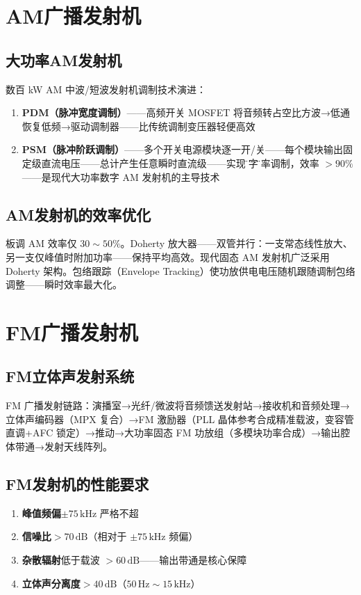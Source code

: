 \documentclass[12pt,UTF8]{ctexbook}
\begin{document}
\section{AM广播发射机}
\label{sec:am_broadcast_tx}

\subsection{大功率AM发射机}

数百 kW AM 中波/短波发射机调制技术演进：
\begin{enumerate}
\item \textbf{PDM（脉冲宽度调制）}——高频开关 MOSFET 将音频转占空比方波→低通恢复低频→驱动调制器——比传统调制变压器轻便高效
\item \textbf{PSM（脉冲阶跃调制）}——多个开关电源模块逐一开/关——每个模块输出固定级直流电压——总计产生任意瞬时直流级——实现\"数字\"功率调制，效率 $>90\%$——是现代大功率数字 AM 发射机的主导技术
\end{enumerate}

\subsection{AM发射机的效率优化}

板调 AM 效率仅 $30\sim50\%$。Doherty 放大器——双管并行：一支常态线性放大、另一支仅峰值时附加功率——保持平均高效。现代固态 AM 发射机广泛采用 Doherty 架构。包络跟踪（Envelope Tracking）使功放供电电压随机跟随调制包络调整——瞬时效率最大化。

\section{FM广播发射机}
\label{sec:fm_broadcast_tx}

\subsection{FM立体声发射系统}

FM 广播发射链路：演播室→光纤/微波将音频馈送发射站→接收机和音频处理→立体声编码器（MPX 复合）→FM 激励器（PLL 晶体参考合成精准载波，变容管直调+AFC 锁定）→推动→大功率固态 FM 功放组（多模块功率合成）→输出腔体带通→发射天线阵列。

\subsection{FM发射机的性能要求}


\begin{enumerate}
\item \textbf{峰值频偏}$\pm75\,\mathrm{kHz}$ 严格不超
\item \textbf{信噪比}$>70\,\mathrm{dB}$（相对于 $\pm75\,\mathrm{kHz}$ 频偏）
\item \textbf{杂散辐射}低于载波 $>60\,\mathrm{dB}$——输出带通是核心保障
\item \textbf{立体声分离度}$>40\,\mathrm{dB}$（$50\,\mathrm{Hz}\sim15\,\mathrm{kHz}$）
\end{enumerate}
\end{document}
